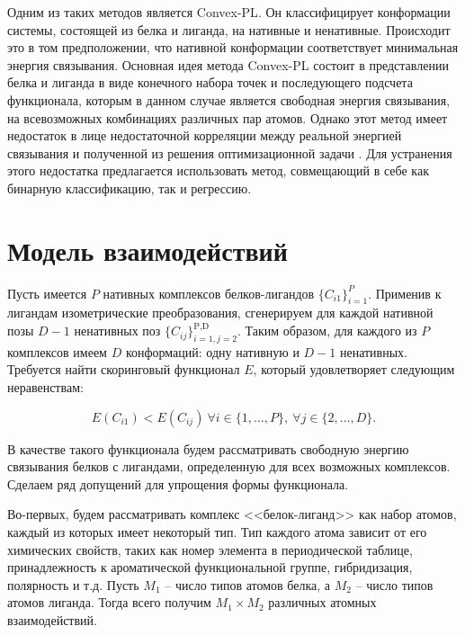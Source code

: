 \documentclass[CEJM,PDF]{Class+Reg_in_Molec_Docking} %
\begin{document}
\hspace{0.5cm}Одним из таких методов является Convex-PL\cite{kadukova2017convex}. Он классифицирует конформации системы, состоящей из белка и лиганда, на нативные и ненативные. Происходит это в том предположении, что нативной конформации соответствует минимальная энергия связывания. Основная идея метода Convex-PL состоит в представлении белка и лиганда в виде конечного набора точек и последующего подсчета функционала, которым в данном случае является свободная энергия связывания, на всевозможных комбинациях различных пар атомов. Однако этот метод имеет недостаток в лице недостаточной корреляции между реальной энергией связывания и полученной из решения оптимизационной задачи \cite{boyd2004convex}. Для устранения этого недостатка предлагается использовать метод, совмещающий в себе как бинарную классификацию, так и  регрессию.

\section{Модель взаимодействий}

\hspace{0.5cm}Пусть имеется $P$ нативных комплексов белков-лигандов $\{C_{i1}\}_{i=1}^P$. Применив к лигандам изометрические преобразования, сгенерируем для каждой нативной позы $D-1$ ненативных поз $\{C_{ij}\}_{i=1,j=2}^{\text{P},\text{D}}$. Таким образом, для каждого из $P$ комплексов имеем $D$ конформаций: одну нативную и $D-1$ ненативных. Требуется найти скоринговый функционал $E$, который удовлетворяет следующим неравенствам:

\begin{equation}\label{eq1}
E(C_{i1}) < E(C_{ij}) \ \forall i\in\{1,\dots,P\}, \ \forall j\in\{2,\dots,D\}.
\end{equation}

\hspace{0.5cm}В качестве такого функционала будем рассматривать свободную энергию связывания белков с лигандами, определенную для всех возможных комплексов. Сделаем ряд допущений для упрощения формы функционала.

\hspace{0.5cm}Во-первых, будем рассматривать комплекс <<белок-лиганд>> как набор атомов, каждый из которых имеет некоторый тип. Тип каждого атома зависит от его химических свойств, таких как номер элемента в периодической таблице, принадлежность к ароматической функциональной группе, гибридизация, полярность и т.д. Пусть $M_1$ -- число типов атомов белка, а $M_2$ -- число типов атомов лиганда. Тогда всего получим $M_1\times M_2$ различных атомных взаимодействий.
\end{document}
